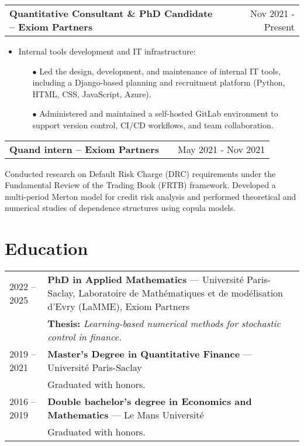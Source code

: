 \documentclass[a4paper,12pt]{article}
\makeatletter
\newenvironment{jobshort}[2]
    {
    \begin{tabularx}{\linewidth}{@{}l X r@{}}
    \textbf{#1} & \hfill &  #2 \\[3.75pt]
    \end{tabularx}
    }
    {
    }
\newenvironment{joblong}[2]
    {
    \begin{tabularx}{\linewidth}{@{}l X r@{}}
    \textbf{#1} & \hfill &  #2 \\[3.75pt]
    \end{tabularx}
    \begin{minipage}[t]{\linewidth}
    \begin{itemize}[nosep,after=\strut, leftmargin=1em, itemsep=3pt,label=--]
    }
    {
    \end{itemize}
    \end{minipage}    
    }
\makeatother
\begin{document}
\begin{joblong}{Quantitative Consultant \& PhD Candidate -- Exiom Partners}{Nov 2021 - Present}
\begin{itemize}
			Performed statistical analysis and developed data-driven models in Python, applying techniques from statistics, data analysis, and machine learning to assess credit quality and model default risk. \\
		\end{itemize}
	\item Internal tools development and IT infrastructure:
		\begin{itemize}
			\item[$\bullet$] Led the design, development, and maintenance of internal IT tools, including a Django-based planning and recruitment platform (Python, HTML, CSS, JavaScript, Azure).
			\item[$\bullet$] Administered and maintained a self-hosted GitLab environment to support version control, CI/CD workflows, and team collaboration.
		\end{itemize}
	\end{joblong}

	\begin{jobshort}{Quand intern -- Exiom Partners}{May 2021 - Nov 2021}
	Conducted research on Default Risk Charge (DRC) requirements under the Fundamental Review of the Trading Book (FRTB) framework.
	Developed a multi-period Merton model for credit risk analysis and performed theoretical and numerical studies of dependence structures using copula models.
	\end{jobshort}

	\section{Education}
	\begin{tabularx}{\linewidth}{@{}l X@{}}	
		2022 -- 2025 & \textbf{PhD in Applied Mathematics} — Université Paris-Saclay, Laboratoire de Mathématiques et de modélisation d'Evry (LaMME), Exiom Partners \\
		& \textbf{Thesis:} \textit{Learning-based numerical methods for stochastic control in finance.} \\
		2019 -- 2021 & \textbf{Master’s Degree in Quantitative Finance} — Université Paris-Saclay \\
		& Graduated with honors. \\
		2016 -- 2019 & \textbf{Double bachelor’s degree in Economics and Mathematics} — Le Mans Université \\
		& Graduated with honors.
	\end{tabularx}
\end{document}
